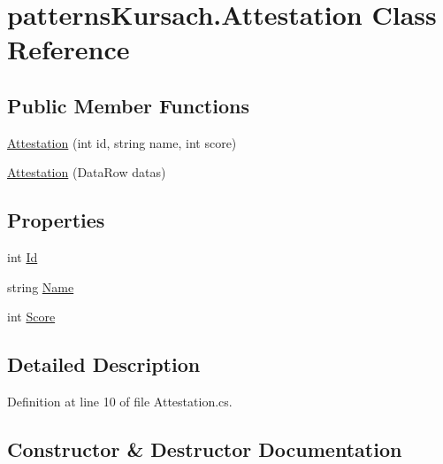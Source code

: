 \hypertarget{classpatterns_kursach_1_1_attestation}{}\section{patterns\+Kursach.\+Attestation Class Reference}
\label{classpatterns_kursach_1_1_attestation}
\subsection*{Public Member Functions}
\begin{DoxyCompactItemize}
\item 
\mbox{\hyperlink{classpatterns_kursach_1_1_attestation_a11cd3e79e12e70081f3ddbadfd8eddb1}{Attestation}} (int id, string name, int score)
\item 
\mbox{\hyperlink{classpatterns_kursach_1_1_attestation_afd3c137a6f89b2ff27f982d9428d6045}{Attestation}} (Data\+Row datas)
\end{DoxyCompactItemize}
\subsection*{Properties}
\begin{DoxyCompactItemize}
\item 
int \mbox{\hyperlink{classpatterns_kursach_1_1_attestation_aa06355b55c39fbd88a91af20cc9c6d30}{Id}}
\item 
string \mbox{\hyperlink{classpatterns_kursach_1_1_attestation_a54974b88500cb3e3676ad1591107575d}{Name}}
\item 
int \mbox{\hyperlink{classpatterns_kursach_1_1_attestation_a1ab816c331523913e55579ccdfb376ce}{Score}}
\end{DoxyCompactItemize}


\subsection{Detailed Description}


Definition at line 10 of file Attestation.\+cs.



\subsection{Constructor \& Destructor Documentation}
\mbox{\label{classpatterns_kursach_1_1_attestation_a11cd3e79e12e70081f3ddbadfd8eddb1}} 
